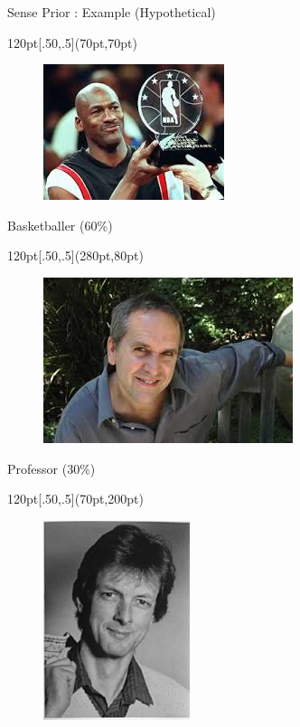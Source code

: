\documentclass{beamer}
\begin{document}
\begin{frame}{Sense Prior : Example (Hypothetical)}
  \begin{textblock*}{120pt}[.50,.5](70pt,70pt)
  \begin{figure}[h]
 
 \includegraphics[bb=0 0 200 150, scale=0.4]{./baske.jpg}
 
\end{figure}
   \centering 
   Basketballer (60\%)
\end{textblock*}
  \begin{textblock*}{120pt}[.50,.5](280pt,80pt)
  \begin{figure}[h]
 \includegraphics[bb=0 0 200 150, scale=0.4]{./prof.jpg}
\end{figure}
\centering
   Professor (30\%)
\end{textblock*}
  \begin{textblock*}{120pt}[.50,.5](70pt,200pt)
  \begin{figure}[h]
 \includegraphics[bb=0 0 200 150, scale=0.4]{./botanist.jpg}

\end{figure}
\end{textblock*}
\end{frame}
\end{document}
